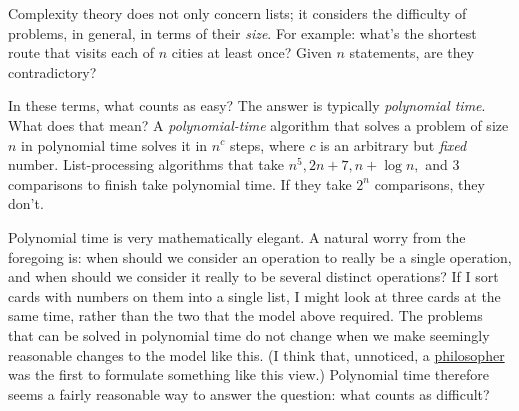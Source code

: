 Complexity theory does not only concern lists; it considers the difficulty of problems, in general, in terms of their \emph{size}. For example: what’s the shortest route that visits each of \(n\) cities at least once? Given \(n\) statements, are they contradictory?

In these terms, what counts as easy? The answer is typically \emph{polynomial time}. What does that mean? A \emph{polynomial-time} algorithm that solves a problem of size \(n\) in polynomial time solves it in \(n^c\) steps, where \(c\) is an arbitrary but \emph{fixed} number. List-processing algorithms that take \(n^5, 2n+7, n+\log n,\) and \(3\) comparisons to finish take polynomial time. If they take \(2^n\) comparisons, they don’t.

Polynomial time is very mathematically elegant. A natural worry from the foregoing is: when should we consider an operation to really be a single operation, and when should we consider it really to be several distinct operations? If I sort cards with numbers on them into a single list, I might look at three cards at the same time, rather than the two that the model above required. The problems that can be solved in polynomial time do not change when we make seemingly reasonable changes to the model like this. (I think that, unnoticed, a \href{https://vignetterie.org/vignettes/invariance.html}{philosopher} was the first to formulate something like this view.) Polynomial time therefore seems a fairly reasonable way to answer the question: what counts as difficult?

